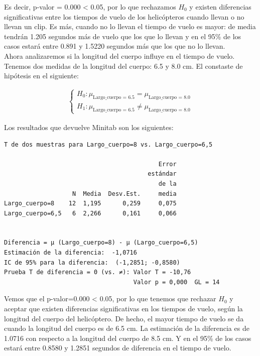 \documentclass[12pt,a4paper,twoside,openright,titlepage,final]{article}
\begin{document}
Es decir, p-valor = 0.000 < 0.05, por lo que rechazamos $H_0$ y existen diferencias significativas entre los tiempos de vuelo de los helicópteros cuando llevan o no llevan un clip. Es más, cuando no lo llevan el tiempo de vuelo es mayor: de media tendrán 1.205 segundos más de vuelo que los que lo llevan y en el 95\% de los casos estará entre 0.891 y 1.5220 segundos más que los que no lo llevan.\\

Ahora analizaremos si la longitud del cuerpo influye en el tiempo de vuelo. Tenemos dos medidas de la longitud del cuerpo: 6.5 y 8.0 cm. El constaste de hipótesis en el siguiente:

\begin{eqnarray*}
	\begin{cases}
		H_0: \mu_{\text{Largo\_cuerpo = 6.5}} = \mu_{\text{Largo\_cuerpo = 8.0}} \\
		H_1: \mu_{\text{Largo\_cuerpo = 6.5}} \neq \mu_{\text{Largo\_cuerpo = 8.0}}
	\end{cases}
\end{eqnarray*}

Los resultados que devuelve Minitab son los siguientes:

\begin{verbatim}
T de dos muestras para Largo_cuerpo=8 vs. Largo_cuerpo=6,5

                                           Error
                                        estándar
                                           de la
                   N  Media  Desv.Est.     media
Largo_cuerpo=8    12  1,195      0,259     0,075
Largo_cuerpo=6,5   6  2,266      0,161     0,066


Diferencia = μ (Largo_cuerpo=8) - μ (Largo_cuerpo=6,5)
Estimación de la diferencia:  -1,0716
IC de 95% para la diferencia:  (-1,2851; -0,8580)
Prueba T de diferencia = 0 (vs. ≠): Valor T = -10,76  
                                    Valor p = 0,000  GL = 14
\end{verbatim}

Vemos que el p-valor=0.000 < 0.05, por lo que tenemos que rechazar $H_0$ y aceptar que existen diferencias significativas en los tiempos de vuelo, según la longitud del cuerpo del helicóptero. De hecho, el mayor tiempo de vuelo se da cuando la longitud del cuerpo es de 6.5 cm. La estimación de la diferencia es de 1.0716 con respecto a la longitud del cuerpo de 8.5 cm. Y en el 95\% de los casos estará entre 0.8580 y 1.2851 segundos de diferencia en el tiempo de vuelo. \\
\end{document}
